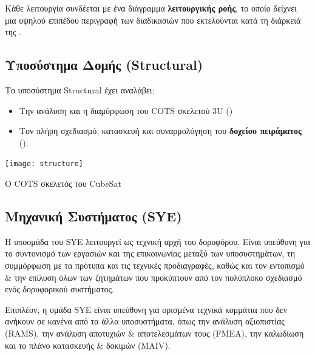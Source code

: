 \documentclass[a4paper,nobib]{tufte-book}
\begin{document}
Κάθε λειτουργία συνδέεται με ένα διάγραμμα \textbf{λειτουργικής ροής}, το οποίο δείχνει μια υψηλού επιπέδου περιγραφή των διαδικασιών που εκτελούνται κατά τη διάρκειά της \autocite{acubesat_functional_2021}.



\subsection{Υποσύστημα Δομής (Structural)}

Το υποσύστημα Structural έχει αναλάβει:
\begin{itemize}
	\item Την ανάλυση και η διαμόρφωση του \ac{COTS} σκελετού 3U () 
	\item Τον πλήρη σχεδιασμό, κατασκευή και συναρμολόγηση του \textbf{δοχείου πειράματος} ().
\end{itemize}

\begin{marginfigure}
	\centering
	\texttt{[image: structure]}
	\caption{Ο \acs{COTS} σκελετός του CubeSat}
	\label{fig:structure}
\end{marginfigure}

\subsection{Μηχανική Συστήματος (\acs{SYE})}

Η υποομάδα του \acl{SYE} λειτουργεί ως τεχνική αρχή του δορυφόρου. Είναι υπεύθυνη για το συντονισμό των εργασιών και της επικοινωνίας μεταξύ των υποσυστημάτων, τη συμμόρφωση με τα πρότυπα και τις τεχνικές προδιαγραφές, καθώς και τον εντοπισμό \& την επίλυση όλων των ζητημάτων που προκύπτουν από τον πολύπλοκο σχεδιασμό ενός δορυφορικού συστήματος.

Επιπλέον, η ομάδα \ac{SYE} είναι υπεύθυνη για ορισμένα τεχνικά κομμάτια που δεν ανήκουν σε κανένα από τα άλλα υποσυστήματα, όπως την ανάλυση αξιοπιστίας (\acs{RAMS}), την ανάλυση αποτυχιών \& αποτελεσμάτων τους (\ac{FMEA}), την καλωδίωση και το πλάνο κατασκευής \& δοκιμών (\acs{MAIV}).
\end{document}
